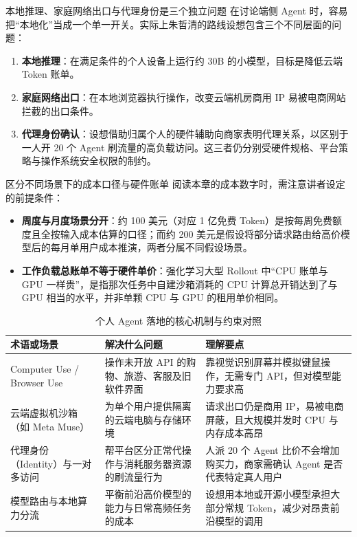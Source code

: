 \documentclass[UTF8,a4paper,11pt,fontset=fandol]{ctexart}
\begin{document}
\begin{knowledgebox}{本地推理、家庭网络出口与代理身份是三个独立问题}
在讨论端侧 Agent 时，容易把“本地化”当成一个单一开关。实际上朱哲清的路线设想包含三个不同层面的问题：
\begin{enumerate}
\item \textbf{本地推理}：在满足条件的个人设备上运行约 30B 的小模型，目标是降低云端 Token 账单。
\item \textbf{家庭网络出口}：在本地浏览器执行操作，改变云端机房商用 IP 易被电商网站拦截的出口条件。
\item \textbf{代理身份确认}：设想借助归属个人的硬件辅助向商家表明代理关系，以区别于一人开 20 个 Agent 刷流量的高负载访问。这三者仍分别受硬件规格、平台策略与操作系统安全权限的制约。
\end{enumerate}
\end{knowledgebox}
\begin{warningbox}{区分不同场景下的成本口径与硬件账单}
阅读本章的成本数字时，需注意讲者设定的前提条件：
\begin{itemize}
\item \textbf{周度与月度场景分开}：约 100 美元（对应 1 亿免费 Token）是按每周免费额度且全按输入成本估算的口径；而约 200 美元是假设将部分请求路由给高价模型后的每月单用户成本推演，两者分属不同假设场景。
\item \textbf{工作负载总账单不等于硬件单价}：强化学习大型 Rollout 中“CPU 账单与 GPU 一样贵”，是指那次任务中自建沙箱消耗的 CPU 计算总开销达到了与 GPU 相当的水平，并非单颗 CPU 与 GPU 的租用单价相同。
\end{itemize}
\end{warningbox}
\begin{table}[H]\centering\small
\caption{个人 Agent 落地的核心机制与约束对照}
\begin{tabular}{>{\raggedright\arraybackslash}p{\dimexpr(\linewidth-6\tabcolsep)/3\relax}>{\raggedright\arraybackslash}p{\dimexpr(\linewidth-6\tabcolsep)/3\relax}>{\raggedright\arraybackslash}p{\dimexpr(\linewidth-6\tabcolsep)/3\relax}}
\toprule
术语或场景 & 解决什么问题 & 理解要点\\\midrule
Computer Use / Browser Use & 操作未开放 API 的购物、旅游、客服及旧软件界面 & 靠视觉识别屏幕并模拟键鼠操作，无需专门 API，但对模型能力要求高\\[4pt]
云端虚拟机沙箱（如 Meta Muse） & 为单个用户提供隔离的云端电脑与存储环境 & 请求出口仍是商用 IP，易被电商屏蔽，且大规模并发时 CPU 与内存成本高昂\\[4pt]
代理身份（Identity）与一对多访问 & 帮平台区分正常代操作与消耗服务器资源的刷流量行为 & 1 人派 20 个 Agent 比价不会增加购买力，商家需确认 Agent 是否代表特定真人用户\\[4pt]
模型路由与本地算力分流 & 平衡前沿高价模型的能力与日常高频任务的成本 & 设想用本地或开源小模型承担大部分常规 Token，减少对昂贵前沿模型的调用\\[4pt]
\bottomrule\end{tabular}\end{table}
\end{document}
